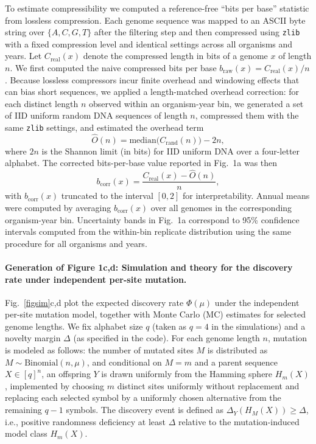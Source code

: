 To estimate compressibility we computed a reference-free ``bits per base'' statistic from lossless compression. Each genome sequence was mapped to an ASCII byte string over $\{A,C,G,T\}$ after the filtering step and then compressed using \texttt{zlib} with a fixed compression level and identical settings across all organisms and years. Let $C_{\mathrm{real}}(x)$ denote the compressed length in bits of a genome $x$ of length $n$. We first computed the naive compressed bits per base $b_{\mathrm{raw}}(x)=C_{\mathrm{real}}(x)/n$. Because lossless compressors incur finite overhead and windowing effects that can bias short sequences, we applied a length-matched overhead correction: for each distinct length $n$ observed within an organism-year bin, we generated a set of IID uniform random DNA sequences of length $n$, compressed them with the same \texttt{zlib} settings, and estimated the overhead term
\[
\widehat{O}(n)=\mathrm{median}\big(C_{\mathrm{rand}}(n)\big)-2n,
\]
where $2n$ is the Shannon limit (in bits) for IID uniform DNA over a four-letter alphabet. The corrected bits-per-base value reported in Fig.~1a was then
\[
b_{\mathrm{corr}}(x)=\frac{C_{\mathrm{real}}(x)-\widehat{O}(n)}{n},
\]
with $b_{\mathrm{corr}}(x)$ truncated to the interval $[0,2]$ for interpretability. Annual means were computed by averaging $b_{\mathrm{corr}}(x)$ over all genomes in the corresponding organism-year bin. Uncertainty bands in Fig.~1a correspond to 95\% confidence intervals computed from the within-bin replicate distribution using the same procedure for all organisms and years.





\paragraph*{Generation of Figure 1c,d: Simulation and theory for the discovery rate under independent per-site mutation.}

Fig.~\ref{figsim}c,d plot the expected discovery rate $\Phi(\mu)$ under the independent per-site mutation model, together with Monte Carlo (MC) estimates for selected genome lengths. We fix alphabet size $q$ (taken as $q=4$ in the simulations) and a novelty margin $\Delta$ (as specified in the code). For each genome length $n$, mutation is modeled as follows: the number of mutated sites $M$ is distributed as $M\sim\mathrm{Binomial}(n,\mu)$, and conditional on $M=m$ and a parent sequence $X\in[q]^n$, an offspring $Y$ is drawn uniformly from the Hamming sphere $H_m(X)$, implemented by choosing $m$ distinct sites uniformly without replacement and replacing each selected symbol by a uniformly chosen alternative from the remaining $q-1$ symbols. The discovery event is defined as $\Delta_Y(H_M(X))\ge \Delta$, i.e., positive randomness deficiency at least $\Delta$ relative to the mutation-induced model class $H_m(X)$.

